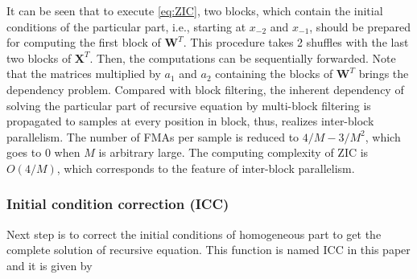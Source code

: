 
It can be seen that to execute \eqref{eq:ZIC}, two blocks, which contain the initial conditions of the particular part, 
i.e., starting at $x_{-2}$ and $x_{-1}$, should be prepared for computing the first block of $\bm{W}^T$. 
This procedure takes 2 shuffles with the last two blocks of $\bm{X}^T$.
Then, the computations can be sequentially forwarded.
Note that the matrices multiplied by $a_1$ and $a_2$ containing the blocks of $\bm{W}^T$
brings the dependency problem. 
Compared with block filtering,
the inherent dependency of solving the particular part of recursive equation by multi-block filtering
is propagated to samples at every position in block, thus, realizes inter-block parallelism.
The number of FMAs per sample is reduced to $4/M{-}3/M^2$,
which goes to 0 when $M$ is arbitrary large.
The computing complexity of ZIC is $O(4/M)$, which corresponds to the feature of inter-block parallelism.

\subsubsection{Initial condition correction (ICC)}

Next step is to correct the initial conditions of homogeneous part to get the complete solution of recursive equation.
This function is named ICC in this paper and it is given by


